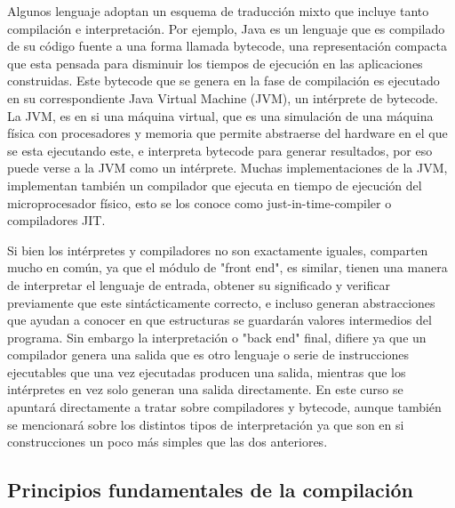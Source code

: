 \documentclass[fleqn]{tcdl}
\begin{document}
Algunos lenguaje adoptan un esquema de traducción mixto que incluye tanto compilación e interpretación. Por ejemplo, Java es un lenguaje que es compilado de su código fuente a una forma llamada bytecode, una representación compacta que esta pensada para disminuir los tiempos de ejecución en las aplicaciones construidas. Este bytecode que se genera en la fase de compilación es ejecutado en su correspondiente Java Virtual Machine (JVM), un intérprete de bytecode. La JVM, es en si una máquina virtual, que es una simulación de una máquina física con procesadores y memoria que permite abstraerse del hardware en el que se esta ejecutando este, e interpreta bytecode para generar resultados, por eso puede verse a la JVM como un intérprete. Muchas implementaciones de la JVM, implementan también un compilador que ejecuta en tiempo de ejecución del microprocesador físico, esto se los conoce como just-in-time-compiler o compiladores JIT.

Si bien los intérpretes y compiladores no son exactamente iguales, comparten mucho en común, ya que el módulo de "front end", es similar, tienen una manera de interpretar el lenguaje de entrada, obtener su significado y verificar previamente que este sintácticamente correcto, e incluso generan abstracciones que ayudan a conocer en que estructuras se guardarán valores intermedios del programa. Sin embargo la interpretación o "back end" final, difiere ya que un compilador genera una salida que es otro lenguaje o serie de instrucciones ejecutables que una vez ejecutadas producen una salida, mientras que los intérpretes en vez solo generan una salida directamente. En este curso se apuntará directamente a tratar sobre compiladores y bytecode, aunque también se mencionará sobre los distintos tipos de interpretación ya que son en si construcciones un poco más simples que las dos anteriores.

\subsection*{Principios fundamentales de la compilación}
\end{document}
